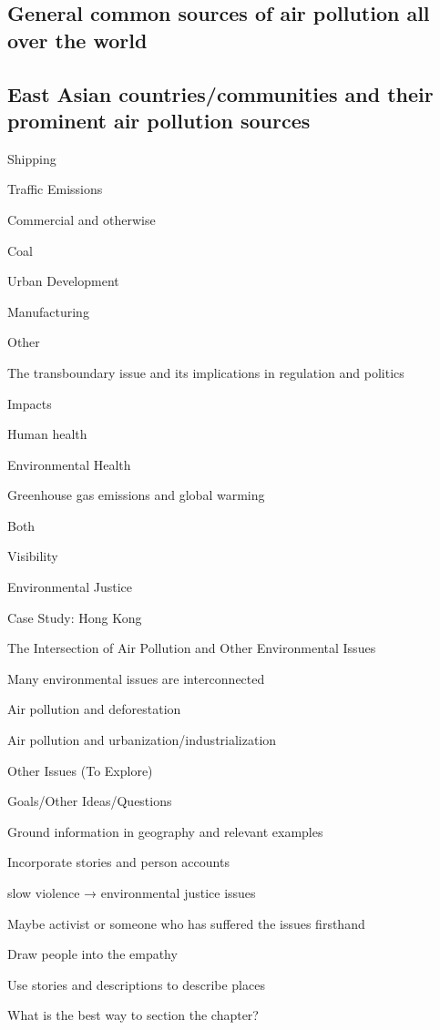 \documentclass{book}\usepackage{knitr}
\begin{document}
\subsection{General common sources of air pollution all over the world}

\subsection{East Asian countries/communities and their prominent air pollution sources}

Shipping

Traffic Emissions

Commercial and otherwise

Coal

Urban Development

Manufacturing

Other

The transboundary issue and its implications in regulation and politics

Impacts

Human health

Environmental Health

Greenhouse gas emissions and global warming

Both

Visibility

Environmental Justice

Case Study: Hong Kong

The Intersection of Air Pollution and Other Environmental Issues

Many environmental issues are interconnected

Air pollution and deforestation

Air pollution and urbanization/industrialization

Other Issues (To Explore)

Goals/Other Ideas/Questions

Ground information in geography and relevant examples

Incorporate stories and person accounts

slow violence → environmental justice issues

Maybe activist or someone who has suffered the issues firsthand

Draw people into the empathy

Use stories and descriptions to describe places

What is the best way to section the chapter?
\end{document}
